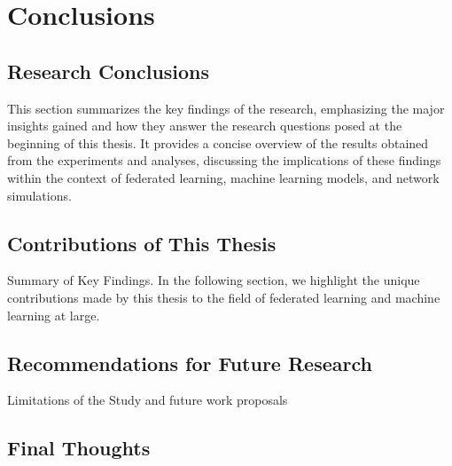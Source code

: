 \chapter{Conclusions}

\section{Research Conclusions}
This section summarizes the key findings of the research, emphasizing the major insights gained and how they answer the research questions posed
at the beginning of this thesis. It provides a concise overview of the results obtained from the experiments and analyses, discussing the
implications of these findings within the context of federated learning, machine learning models, and network simulations.

\section{Contributions of This Thesis}
Summary of Key Findings.
In the following section, we highlight the unique contributions made by this thesis to the field of federated learning and machine learning at large.

\section{Recommendations for Future Research}
Limitations of the Study and future work proposals

\section{Final Thoughts}

